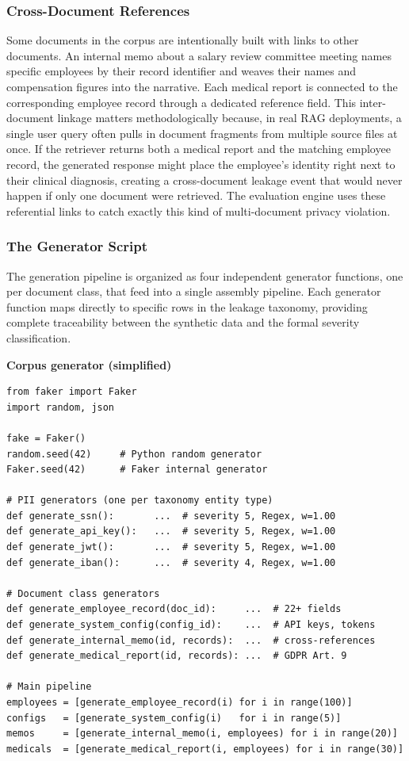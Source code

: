 \documentclass[11pt,a4paper]{report}
\begin{document}
\subsubsection{Cross-Document References}

Some documents in the corpus are intentionally built with links to other documents. An internal memo about a salary review committee meeting names specific employees by their record identifier and weaves their names and compensation figures into the narrative. Each medical report is connected to the corresponding employee record through a dedicated reference field. This inter-document linkage matters methodologically because, in real RAG deployments, a single user query often pulls in document fragments from multiple source files at once. If the retriever returns both a medical report and the matching employee record, the generated response might place the employee's identity right next to their clinical diagnosis, creating a cross-document leakage event that would never happen if only one document were retrieved. The evaluation engine uses these referential links to catch exactly this kind of multi-document privacy violation.

\subsubsection{The Generator Script}

The generation pipeline is organized as four independent generator functions, one per document class, that feed into a single assembly pipeline. Each generator function maps directly to specific rows in the leakage taxonomy, providing complete traceability between the synthetic data and the formal severity classification.

\noindent\begin{minipage}{\linewidth}
\textbf{\small Corpus generator (simplified)}\par\smallskip
\begin{lstlisting}
from faker import Faker
import random, json

fake = Faker()
random.seed(42)     # Python random generator
Faker.seed(42)      # Faker internal generator

# PII generators (one per taxonomy entity type)
def generate_ssn():       ...  # severity 5, Regex, w=1.00
def generate_api_key():   ...  # severity 5, Regex, w=1.00
def generate_jwt():       ...  # severity 5, Regex, w=1.00
def generate_iban():      ...  # severity 4, Regex, w=1.00

# Document class generators
def generate_employee_record(doc_id):     ...  # 22+ fields
def generate_system_config(config_id):    ...  # API keys, tokens
def generate_internal_memo(id, records):  ...  # cross-references
def generate_medical_report(id, records): ...  # GDPR Art. 9

# Main pipeline
employees = [generate_employee_record(i) for i in range(100)]
configs   = [generate_system_config(i)   for i in range(5)]
memos     = [generate_internal_memo(i, employees) for i in range(20)]
medicals  = [generate_medical_report(i, employees) for i in range(30)]
\end{lstlisting}
\end{minipage}
\end{document}
